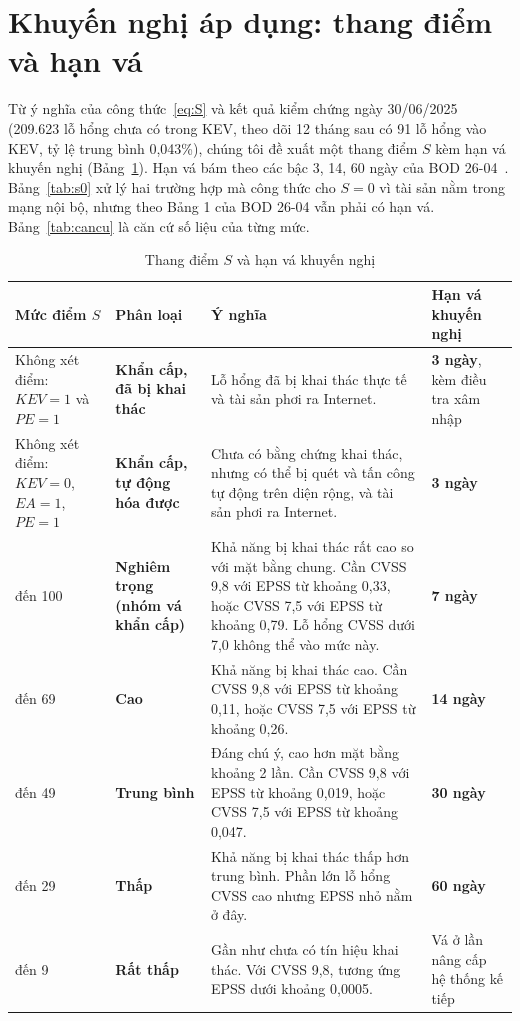 \documentclass[runningheads]{llncs}
\begin{document}
\section{Khuyến nghị áp dụng: thang điểm và hạn vá}\label{sec:khuyennghi}

Từ ý nghĩa của công thức~\eqref{eq:S} và kết quả kiểm chứng ngày 30/06/2025 (209.623 lỗ hổng chưa có trong KEV,
theo dõi 12 tháng sau có 91 lỗ hổng vào KEV, tỷ lệ trung bình 0,043\%), chúng tôi đề xuất một thang điểm $S$ kèm hạn vá
khuyến nghị (Bảng~\ref{tab:thangdiem}). Hạn vá bám theo các bậc 3, 14, 60 ngày của BOD 26-04~\cite{bod2604}.
Bảng~\ref{tab:s0} xử lý hai trường hợp mà công thức cho $S = 0$ vì tài sản nằm trong mạng nội bộ, nhưng theo Bảng 1
của BOD 26-04 vẫn phải có hạn vá. Bảng~\ref{tab:cancu} là căn cứ số liệu của từng mức.

\begin{table}
\centering
\caption{Thang điểm $S$ và hạn vá khuyến nghị}\label{tab:thangdiem}
\scriptsize
\setlength{\tabcolsep}{4pt}
\begin{tabular}{>{\raggedright\arraybackslash}p{2.1cm}>{\raggedright\arraybackslash}p{1.9cm}>{\raggedright\arraybackslash}p{4.9cm}>{\raggedright\arraybackslash}p{1.9cm}}
\toprule
Mức điểm $S$ & Phân loại & Ý nghĩa & Hạn vá khuyến nghị \\
\midrule
Không xét điểm: $\mathit{KEV} = 1$ và $\mathit{PE} = 1$ & \textbf{Khẩn cấp, đã bị khai thác} & Lỗ hổng đã bị khai thác thực tế và tài sản phơi ra Internet. & \textbf{3 ngày}, kèm điều tra xâm nhập \\
Không xét điểm: $\mathit{KEV} = 0$, $\mathit{EA} = 1$, $\mathit{PE} = 1$ & \textbf{Khẩn cấp, tự động hóa được} & Chưa có bằng chứng khai thác, nhưng có thể bị quét và tấn công tự động trên diện rộng, và tài sản phơi ra Internet. & \textbf{3 ngày} \\
70 đến 100 & \textbf{Nghiêm trọng (nhóm vá khẩn cấp)} & Khả năng bị khai thác rất cao so với mặt bằng chung. Cần CVSS 9,8 với EPSS từ khoảng 0,33, hoặc CVSS 7,5 với EPSS từ khoảng 0,79. Lỗ hổng CVSS dưới 7,0 không thể vào mức này. & \textbf{7 ngày} \\
50 đến 69 & \textbf{Cao} & Khả năng bị khai thác cao. Cần CVSS 9,8 với EPSS từ khoảng 0,11, hoặc CVSS 7,5 với EPSS từ khoảng 0,26. & \textbf{14 ngày} \\
30 đến 49 & \textbf{Trung bình} & Đáng chú ý, cao hơn mặt bằng khoảng 2 lần. Cần CVSS 9,8 với EPSS từ khoảng 0,019, hoặc CVSS 7,5 với EPSS từ khoảng 0,047. & \textbf{30 ngày} \\
10 đến 29 & \textbf{Thấp} & Khả năng bị khai thác thấp hơn trung bình. Phần lớn lỗ hổng CVSS cao nhưng EPSS nhỏ nằm ở đây. & \textbf{60 ngày} \\
0 đến 9 & \textbf{Rất thấp} & Gần như chưa có tín hiệu khai thác. Với CVSS 9,8, tương ứng EPSS dưới khoảng 0,0005. & Vá ở lần nâng cấp hệ thống kế tiếp \\
\bottomrule
\end{tabular}
\end{table}
\end{document}
